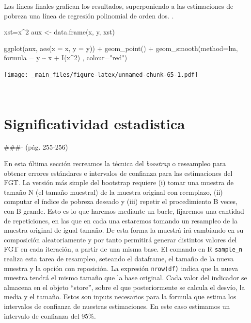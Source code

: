\documentclass[
]{book}
\newenvironment{Shaded}{\begin{snugshade}}{\end{snugshade}}
\newcommand{\AttributeTok}[1]{\textcolor[rgb]{0.77,0.63,0.00}{#1}}
\newcommand{\DecValTok}[1]{\textcolor[rgb]{0.00,0.00,0.81}{#1}}
\newcommand{\FunctionTok}[1]{\textcolor[rgb]{0.00,0.00,0.00}{#1}}
\newcommand{\NormalTok}[1]{#1}
\newcommand{\OtherTok}[1]{\textcolor[rgb]{0.56,0.35,0.01}{#1}}
\newcommand{\SpecialCharTok}[1]{\textcolor[rgb]{0.00,0.00,0.00}{#1}}
\newcommand{\StringTok}[1]{\textcolor[rgb]{0.31,0.60,0.02}{#1}}
\begin{document}
Las líneas finales grafican los resultados, superponiendo a las estimaciones de pobreza una línea de regresión polinomial de orden dos.
.

\begin{Shaded}
\begin{Highlighting}[]
\NormalTok{xst}\OtherTok{=}\NormalTok{x}\SpecialCharTok{\^{}}\DecValTok{2}
\NormalTok{aux }\OtherTok{\textless{}{-}} \FunctionTok{data.frame}\NormalTok{(x, y, xst)}

\FunctionTok{ggplot}\NormalTok{(aux, }\FunctionTok{aes}\NormalTok{(}\AttributeTok{x =}\NormalTok{ x, }\AttributeTok{y =}\NormalTok{ y)) }\SpecialCharTok{+} 
  \FunctionTok{geom\_point}\NormalTok{() }\SpecialCharTok{+} 
\FunctionTok{geom\_smooth}\NormalTok{(}\AttributeTok{method=}\NormalTok{lm, }\AttributeTok{formula =}\NormalTok{ y }\SpecialCharTok{\textasciitilde{}}\NormalTok{ x }\SpecialCharTok{+} \FunctionTok{I}\NormalTok{(x}\SpecialCharTok{\^{}}\DecValTok{2}\NormalTok{) , }\AttributeTok{colour=}\StringTok{"red"}\NormalTok{)}
\end{Highlighting}
\end{Shaded}

\texttt{[image: \_main\_files/figure-latex/unnamed-chunk-65-1.pdf]}

~

\hypertarget{significatividad-estadistica}{%
\section{Significatividad estadistica}\label{significatividad-estadistica}}

\#\#\#- (pág. 255-256)

En esta última sección recreamos la técnica del \emph{boostrap} o reseampleo para obtener errores estándares e intervalos de confianza para las estimaciones del FGT. La versión más simple del bootstrap requiere (i) tomar una muestra de tamaño N (el tamaño muestral) de la muestra original con reemplazo, (ii) computar el índice de pobreza deseado y (iii) repetir el procedimiento B veces, con B grande. Esto es lo que haremos mediante un bucle, fijaremos una cantidad de repeticiones, en las que en cada una estaremos tomando un resampleo de la muestra original de igual tamaño. De esta forma la muestrá irá cambiando en su composición aleatoriamente y por tanto permitirá generar distintos valores del FGT en cada iteración, a partir de una misma base. El comando en R \texttt{sample\_n} realiza esta tarea de resampleo, seteando el dataframe, el tamaño de la nueva muestra y la opción con reposición. La expresión \texttt{nrow(df)} indica que la nueva muestra tendrá el mismo tamaño que la base original. Cada valor del indicador se almacena en el objeto ``store'', sobre el que posteriormente se calcula el desvío, la media y el tamaño. Estos son inputs necesarios para la formula que estima los intervalos de confianza de nuestras estimaciones. En este caso estimamos un intervalo de confianza del 95\%.
\end{document}
